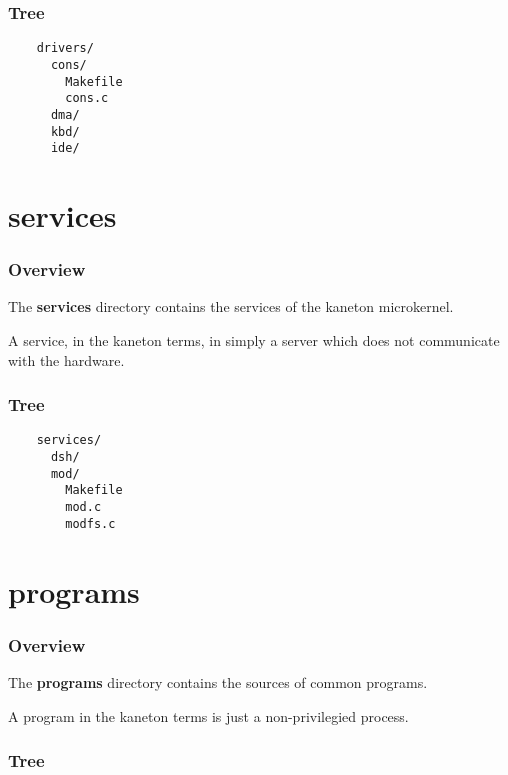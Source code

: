 {%

\begin{frame}[containsverbatim]
  \frametitle{Tree}

  \begin{verbatim}
    drivers/
      cons/
        Makefile
        cons.c
      dma/
      kbd/
      ide/
  \end{verbatim}
\end{frame}

%
%

\section{services}


\begin{frame}
  \frametitle{Overview}

  The \textbf{services} directory contains the services of the kaneton
  microkernel.

  \nl

  A service, in the kaneton terms, in simply a server which does not
  communicate with the hardware.
\end{frame}


\begin{frame}[containsverbatim]
  \frametitle{Tree}

  \begin{verbatim}
    services/
      dsh/
      mod/
        Makefile
        mod.c
        modfs.c
  \end{verbatim}
\end{frame}

%
%

\section{programs}


\begin{frame}
  \frametitle{Overview}

  The \textbf{programs} directory contains the sources of common
  programs.

  \nl

  A program in the kaneton terms is just a non-privilegied
  process.
\end{frame}


\begin{frame}[containsverbatim]
  \frametitle{Tree}


\end{frame}}
